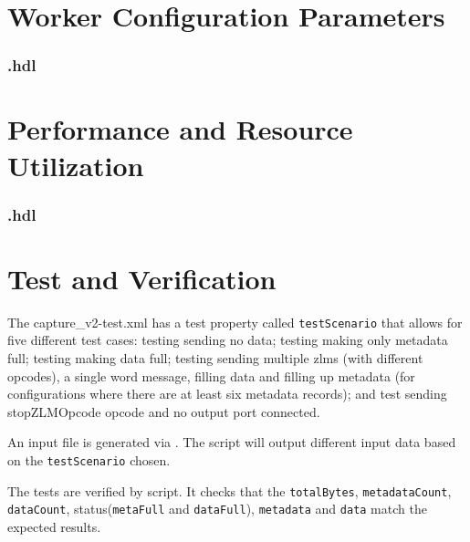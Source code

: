 \begin{landscape}
\section*{Worker Configuration Parameters}
\subsubsection*{\comp.hdl}
%
\section*{Performance and Resource Utilization}
\subsubsection*{\comp.hdl}
%
\end{landscape}


\section*{Test and Verification}
\normalsize

\begin{flushleft}

The capture\_v2-test.xml has a test property called \texttt{testScenario} that allows for five different test cases: testing sending no data; testing making only metadata full; testing making data full; testing sending multiple zlms (with different opcodes), a single word message, filling data and filling up metadata (for configurations where there are at least six metadata records); and test sending stopZLMOpcode opcode and no output port connected.
\newline

An input file is generated via . The  script will output different input data based on the \texttt{testScenario} chosen.
\newline

The tests are verified by  script. It checks that the \texttt{totalBytes}, \texttt{metadataCount}, \texttt{dataCount}, status(\texttt{metaFull} and \texttt{dataFull}), \texttt{metadata} and \texttt{data} match the expected results. \newline

\end{flushleft}

